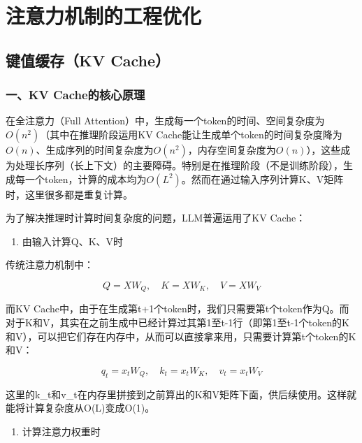 \hypertarget{ux6ce8ux610fux529bux673aux5236ux7684ux5de5ux7a0bux4f18ux5316}{%
\chapter{注意力机制的工程优化}\label{ux6ce8ux610fux529bux673aux5236ux7684ux5de5ux7a0bux4f18ux5316}}

\hypertarget{ux952eux503cux7f13ux5b58kv-cache}{%
\section{键值缓存（KV Cache）}\label{ux952eux503cux7f13ux5b58kv-cache}}

\hypertarget{ux4e00kv-cacheux7684ux6838ux5fc3ux539fux7406}{%
\subsection{一、KV Cache的核心原理}\label{ux4e00kv-cacheux7684ux6838ux5fc3ux539fux7406}}

在全注意力（Full Attention）中，生成每一个token的时间、空间复杂度为\(O(n^2)\)（其中在推理阶段运用KV Cache能让生成单个token的时间复杂度降为\(O(n)\)、生成序列的时间复杂度为\(O(n^2)\)，内存空间复杂度为\(O(n)\)），这些成为处理长序列（长上下文）的主要障碍。特别是在推理阶段（不是训练阶段），生成每一个token，计算的成本均为\(O(L^2)\)。然而在通过输入序列计算K、V矩阵时，这里很多都是重复计算。

为了解决推理时计算时间复杂度的问题，LLM普遍运用了KV Cache：

\begin{enumerate}
\def\labelenumi{\arabic{enumi}.}
\tightlist
\item
  由输入计算Q、K、V时
\end{enumerate}

传统注意力机制中：

\[
Q = XW_Q,\quad K = XW_K,\quad V = XW_V
\]

而KV Cache中，由于在生成第t+1个token时，我们只需要第t个token作为Q。而对于K和V，其实在之前生成中已经计算过其第1至t-1行（即第1至t-1个token的K和V），可以把它们存在内存中，从而可以直接拿来用，只需要计算第t个token的K和V：

\[
q_t = x_tW_Q,\quad k_t = x_tW_K,\quad v_t = x_tW_V
\]

这里的k\_t和v\_t在内存里拼接到之前算出的K和V矩阵下面，供后续使用。这样就能将计算复杂度从O(L)变成O(1)。

\begin{enumerate}
\def\labelenumi{\arabic{enumi}.}
\setcounter{enumi}{1}
\tightlist
\item
  计算注意力权重时
\end{enumerate}

